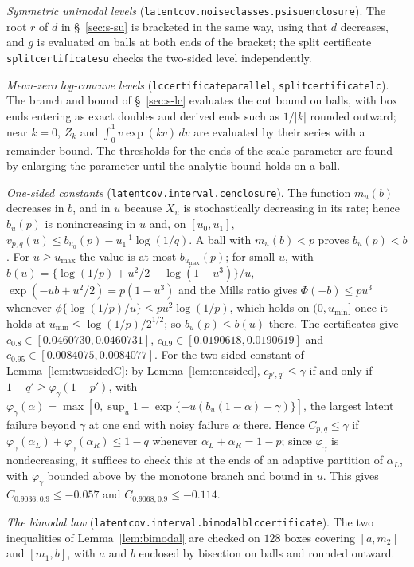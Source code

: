 \documentclass[12pt]{article}
\renewcommand{\_}{\usc\allowbreak}
\theoremstyle{definition}
\numberwithin{equation}{section}
\begin{document}
\emph{Symmetric unimodal levels} (\texttt{latentcov.noise\_classes.psi\_su\_enclosure}). The root $r$ of $d$ in \S~\ref{sec:s-su} is bracketed in the same way, using that $d$ decreases, and $g$ is evaluated on balls at both ends of the bracket; the split certificate \texttt{split\_certificate\_su} checks the two-sided level independently.

\emph{Mean-zero log-concave levels} (\texttt{lc\_certificate\_parallel}, \texttt{split\_certificate\_lc}). The branch and bound of \S~\ref{sec:s-lc} evaluates the cut bound on balls, with box ends entering as exact doubles and derived ends such as $1/|k|$ rounded outward; near $k = 0$, $Z_k$ and $\int_0^1v\exp(kv)\,dv$ are evaluated by their series with a remainder bound. The thresholds for the ends of the scale parameter are found by enlarging the parameter until the analytic bound holds on a ball.

\emph{One-sided constants} (\texttt{latentcov.interval.c\_enclosure}). The function $m_u(b)$ decreases in $b$, and in $u$ because $X_u$ is stochastically decreasing in its rate; hence $b_u(p)$ is nonincreasing in $u$ and, on $[u_0, u_1]$, $v_{p,q}(u) \le b_{u_0}(p) - u_1^{-1}\log(1/q)$. A ball with $m_u(b) < p$ proves $b_u(p) < b$. For $u \ge u_{\max}$ the value is at most $b_{u_{\max}}(p)$; for small $u$, with $b(u) = \{\log(1/p) + u^2/2 - \log(1 - u^3)\}/u$, $\exp(-ub + u^2/2) = p(1 - u^3)$ and the Mills ratio gives $\Phi(-b) \le pu^3$ whenever $\phi\{\log(1/p)/u\} \le pu^2\log(1/p)$, which holds on $(0, u_{\min}]$ once it holds at $u_{\min} \le \log(1/p)/2^{1/2}$; so $b_u(p) \le b(u)$ there. The certificates give $c_{0.8} \in [0.0460730, 0.0460731]$, $c_{0.9} \in [0.0190618, 0.0190619]$ and $c_{0.95} \in [0.0084075, 0.0084077]$. For the two-sided constant of Lemma~\ref{lem:twosidedC}: by Lemma~\ref{lem:onesided}, $c_{p',q'} \le \gamma$ if and only if $1 - q' \ge \varphi_\gamma(1 - p')$, with $\varphi_\gamma(\alpha) = \max[0, \sup_u 1 - \exp\{-u(b_u(1 - \alpha) - \gamma)\}]$, the largest latent failure beyond $\gamma$ at one end with noisy failure $\alpha$ there. Hence $C_{p,q} \le \gamma$ if $\varphi_\gamma(\alpha_L) + \varphi_\gamma(\alpha_R) \le 1 - q$ whenever $\alpha_L + \alpha_R = 1 - p$; since $\varphi_\gamma$ is nondecreasing, it suffices to check this at the ends of an adaptive partition of $\alpha_L$, with $\varphi_\gamma$ bounded above by the monotone branch and bound in $u$. This gives $C_{0.9036,0.9} \le -0.057$ and $C_{0.9068,0.9} \le -0.114$.

\emph{The bimodal law} (\texttt{latentcov.interval.bimodal\_blc\_certificate}). The two inequalities of Lemma~\ref{lem:bimodal} are checked on $128$ boxes covering $[a, m_2]$ and $[m_1, b]$, with $a$ and $b$ enclosed by bisection on balls and rounded outward.
\end{document}
